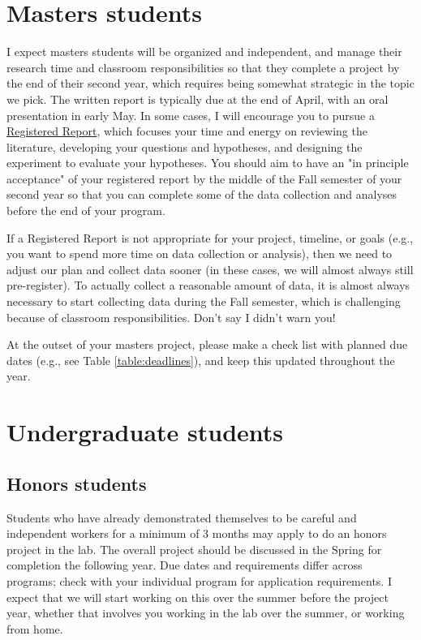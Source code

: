 \documentclass[letterpaper,12pt,oneside]{memoir}
\begin{document}
\section{Masters students}
I expect masters students will be organized and independent, and manage their research time and classroom responsibilities so that they complete a project by the end of their second year, which requires being somewhat strategic in the topic we pick. The written report is typically due at the end of April, with an oral presentation in early May. In some cases, I will encourage you to pursue a \href{https://cos.io/rr/}{Registered Report}, which focuses your time and energy on reviewing the literature, developing your questions and hypotheses, and designing the experiment to evaluate your hypotheses. You should aim to have an "in principle acceptance" of your registered report by the middle of the Fall semester of your second year so that you can complete some of the data collection and analyses before the end of your program.

If a Registered Report is not appropriate for your project, timeline, or goals (e.g., you want to spend more time on data collection or analysis), then we need to adjust our plan and collect data sooner (in these cases, we will almost always still pre-register). To actually collect a reasonable amount of data, it is almost always necessary to start collecting data during the Fall semester, which is challenging because of classroom responsibilities. Don't say I didn't warn you!

At the outset of your masters project, please make a check list with planned due dates (e.g., see Table \ref{table:deadlines}), and keep this updated throughout the year.

\section{Undergraduate students}

\subsection{Honors students}

Students who have already demonstrated themselves to be careful and independent workers for a minimum of 3 months may apply to do an honors project in the lab. The overall project should be discussed in the Spring for completion the following year. Due dates and requirements differ across programs; check with your individual program for application requirements. I expect that we will start working on this over the summer before the project year, whether that involves you working in the lab over the summer, or working from home.
\end{document}
